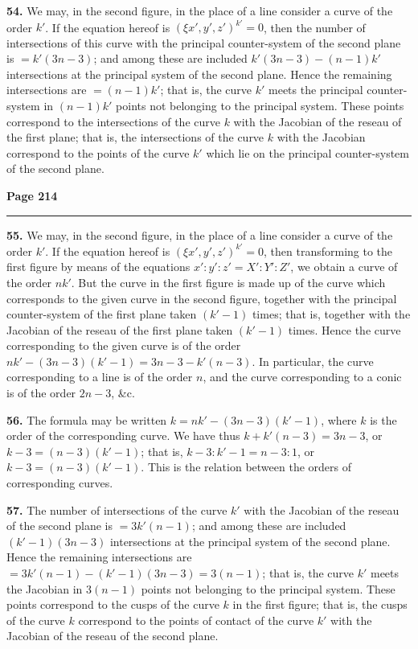 \documentclass[12pt,a4paper]{article}
\theoremstyle{plain}
\theoremstyle{definition}
\theoremstyle{remark}
\begin{document}
\textbf{54.} We may, in the second figure, in the place of a line consider a curve of the order $k'$. If the equation hereof is $(\xi x', y', z')^{k'} = 0$, then the number of intersections of this curve with the principal counter-system of the second plane is $= k'(3n - 3)$; and among these are included $k'(3n - 3) - (n - 1)k'$ intersections at the principal system of the second plane. Hence the remaining intersections are $= (n - 1)k'$; that is, the curve $k'$ meets the principal counter-system in $(n - 1)k'$ points not belonging to the principal system. These points correspond to the intersections of the curve $k$ with the Jacobian of the reseau of the first plane; that is, the intersections of the curve $k$ with the Jacobian correspond to the points of the curve $k'$ which lie on the principal counter-system of the second plane.

\newpage
\noindent\textbf{Page 214}\\
\noindent\rule{\textwidth}{0.4pt}

\smallskip

\noindent\textbf{55.} We may, in the second figure, in the place of a line consider a curve of the order $k'$. If the equation hereof is $(\xi x', y', z')^{k'} = 0$, then transforming to the first figure by means of the equations $x' : y' : z' = X' : Y' : Z'$, we obtain a curve of the order $nk'$. But the curve in the first figure is made up of the curve which corresponds to the given curve in the second figure, together with the principal counter-system of the first plane taken $(k' - 1)$ times; that is, together with the Jacobian of the reseau of the first plane taken $(k' - 1)$ times. Hence the curve corresponding to the given curve is of the order $nk' - (3n - 3)(k' - 1) = 3n - 3 - k'(n - 3)$. In particular, the curve corresponding to a line is of the order $n$, and the curve corresponding to a conic is of the order $2n - 3$, \&c.

\textbf{56.} The formula may be written $k = nk' - (3n - 3)(k' - 1)$, where $k$ is the order of the corresponding curve. We have thus $k + k'(n - 3) = 3n - 3$, or $k - 3 = (n - 3)(k' - 1)$; that is, $k - 3 : k' - 1 = n - 3 : 1$, or $k - 3 = (n - 3)(k' - 1)$. This is the relation between the orders of corresponding curves.

\textbf{57.} The number of intersections of the curve $k'$ with the Jacobian of the reseau of the second plane is $= 3k'(n - 1)$; and among these are included $(k' - 1)(3n - 3)$ intersections at the principal system of the second plane. Hence the remaining intersections are $= 3k'(n - 1) - (k' - 1)(3n - 3) = 3(n - 1)$; that is, the curve $k'$ meets the Jacobian in $3(n - 1)$ points not belonging to the principal system. These points correspond to the cusps of the curve $k$ in the first figure; that is, the cusps of the curve $k$ correspond to the points of contact of the curve $k'$ with the Jacobian of the reseau of the second plane.
\end{document}
